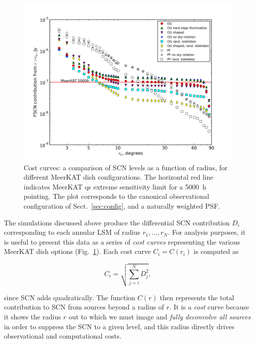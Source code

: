 \documentclass{aa}
\begin{document}
\begin{figure}
\includegraphics[width=\columnwidth]{costcurve-main}
\caption{\label{fig:cc-main}Cost curves: a comparison of SCN levels as a function of radius, for different MeerKAT dish configurations. The horizontal red line indicates MeerKAT
qs extreme sensitivity limit for a 5000~h pointing. The plot corresponds to the canonical observational configuration of Sect.~\ref{sec:config}, and a naturally weighted PSF.}
\end{figure}

The simulations discussed above produce the differential SCN contribution $D_i$ corresponding to each annular LSM of radius $r_1,...,r_N$. For analysis purposes, it is useful to present this data as a series of {\em cost curves} representing the various MeerKAT dish options (Fig.~\ref{fig:cc-main}). Each cost curve $C_i=C(r_i)$ is computed as

\[
  C_i = \sqrt{\sum_{j=i}^{N} D^2_j},
\]

since SCN adds quadratically. The function $C(r)$ then represents the total contribution to SCN from sources beyond a radius of $r$. It is a \emph{cost} curve because it shows the radius $r$ out to which we must image and {\em fully deconvolve all sources} in order to suppress the SCN to a given level, and this radius directly drives observational and computational costs. 
\end{document}
